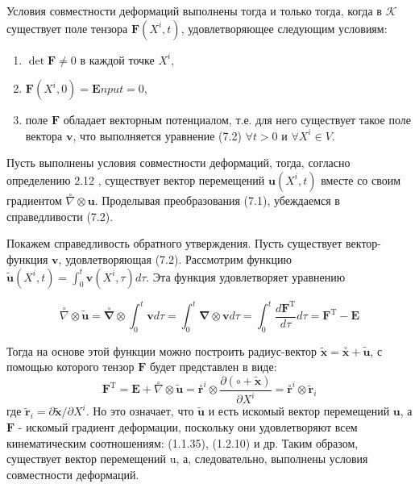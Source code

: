 \begin{theorem} Условия совместности деформаций выполнены тогда и только тогда, когда в $\mathcal{K}$ существует поле тензора $\mathbf{F}\left(X^{i}, t\right)$, удовлетворяющее следующим условиям:
\begin{enumerate}
    \item $\operatorname{det} \mathbf{F} \neq 0$ в каждой точке $X^{i}$,
    \item $\mathbf{F}\left(X^{i}, 0\right)=\mathbf{E} n p u t=0$,
    \item поле $\mathbf{F}$ обладает векторным потенциалом, т.е. для него существует такое поле вектора $\mathbf{v}$, что выполняется уравнение (7.2) $\forall t>0$ и $\forall X^{i} \in V$.
\end{enumerate}
\end{theorem}

 Пусть выполнены условия совместности деформаций, тогда, согласно определению 2.12 , существует вектор перемещений $\mathbf{u}\left(X^{i}, t\right)$ вместе со своим градиентом $\stackrel{\circ}{\nabla} \otimes \mathbf{u}$. Проделывая преобразования (7.1), убеждаемся в справедливости (7.2).

Покажем справедливость обратного утверждения. Пусть существует вектор-функция $\mathbf{v}$, удовлетворяющая (7.2). Рассмотрим функцию $\widetilde{\mathbf{u}}\left(X^{i}, t\right)=\int_{0}^{t} \mathbf{v}\left(X^{i}, \tau\right) d \tau$. Эта функция удовлетворяет уравнению

\begin{equation}
\label{eq:73}
\stackrel{\circ}{\nabla} \otimes \widetilde{\mathbf{u}}=\stackrel{\circ}{\boldsymbol{\nabla}} \otimes \int_{0}^{t} \mathbf{v} d \tau=\int_{0}^{t} \boldsymbol{\nabla} \otimes \mathbf{v} d \tau=\int_{0}^{t} \frac{d \mathbf{F}^{\mathrm{T}}}{d \tau} d \tau=\mathbf{F}^{\mathrm{T}}-\mathbf{E} 
\end{equation}

Тогда на основе этой функции можно построить радиус-вектор $\widetilde{\mathbf{x}}=\stackrel{\circ}{\mathbf{x}}+\widetilde{\mathbf{u}}$, с помощью которого тензор $\mathbf{F}$ будет представлен в виде:
\begin{equation}
\label{eq:74}
\mathbf{F}^{\mathrm{T}}=\mathbf{E}+\stackrel{\circ}{\nabla} \otimes \widetilde{\mathbf{u}}=\stackrel{\circ}{\mathbf{r}}^{i} \otimes \frac{\partial(\mathbf{\circ}+\widetilde{\mathbf{x}})}{\partial X^{i}}=\stackrel{\circ}{\mathbf{r}}^{i} \otimes \widetilde{\mathbf{r}}_{i}
\end{equation}
где $\widetilde{\mathbf{r}}_{i}=\partial \widetilde{\mathbf{x}} / \partial X^{i}$. Но это означает, что $\widetilde{\mathbf{u}}$ и есть искомый вектор перемещений $\mathbf{u}$, а $\mathbf{F}$ - искомый градиент деформации, поскольку они удовлетворяют
всем кинематическим соотношениям: (1.1.35), (1.2.10) и др. Таким образом, существует вектор перемещений u, а, следовательно, выполнены условия совместности деформаций.

